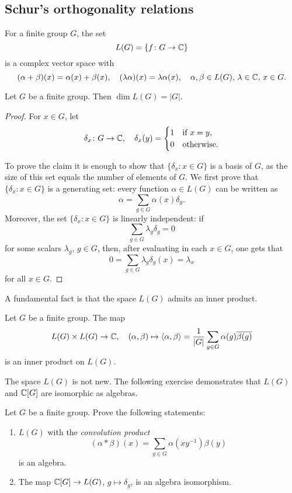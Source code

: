 \subsection{Schur's orthogonality relations}

For a finite group $G$, the set                             
\[
L(G)=\{f\colon G\to\mathbb{C}\}
\]
is a complex vector space with
\[
    (\alpha+\beta)(x)=\alpha(x)+\beta(x),
    \quad
    (\lambda\alpha)(x)=\lambda\alpha(x),
    \quad 
    \alpha,\beta\in L(G),\,\lambda\in\mathbb{C},\,x\in G.
\]

\begin{proposition}
\label{pro:dimL(G)=|G|}
    Let $G$ be a finite group. Then $\dim L(G)=|G|$. 
\end{proposition}

\begin{proof}
For $x\in G$, 
let 
\[
\delta_x\colon G\to\mathbb{C},\quad \delta_x(y)=\begin{cases}
    1 & \text{if $x=y$},\\
    0 & \text{otherwise.}
    \end{cases}
\]

To prove the claim it is enough to show that 
$\{\delta_x:x\in G\}$ is a basis of $G$, as the size of this set equals the
number of elements of $G$. 
We first prove that $\{\delta_x:x\in G\}$  is a generating set: every function
$\alpha\in L(G)$ can be written as
\[
\alpha=\sum_{g\in G}\alpha(x)\delta_g.
\]
Moreover, the set $\{\delta_x:x\in G\}$ is linearly independent: if 
\[
\sum_{g\in G}\lambda_g\delta_g=0
\]
for some scalars $\lambda_g$, $g\in G$, then, after evaluating in each $x\in G$, one gets that 
\[
0%
=\sum_{g\in G}\lambda_g\delta_g(x)=\lambda_x
\]
for all $x\in G$. 
\end{proof}

A fundamental fact is that the space $L(G)$ admits an inner product. 

\begin{exercise}
Let $G$ be a finite group. The map 
\[
L(G)\times L(G)\to\mathbb{C},\quad 
(\alpha,\beta)\mapsto \langle\alpha,\beta\rangle=\frac{1}{|G|}\sum_{g\in G}\alpha(g)\overline{\beta(g)}
\]
is an inner product on $L(G)$. 
\end{exercise}

The space $L(G)$ is not new. The following exercise demonstrates that 
$L(G)$ and $\mathbb{C}[G]$ are isomorphic as algebras. 

\begin{bonus}
Let $G$ be a finite group. Prove the following statements:
\begin{enumerate}
    \item $L(G)$ with the \emph{convolution product}
    \[
    (\alpha*\beta)(x)=\sum_{y\in G}\alpha(xy^{-1})\beta(y)
    \]
    is an algebra. 
    \item The map $\mathbb{C}[G]\to L(G)$, $g\mapsto\delta_g$,
        is an algebra isomorphism.
    \end{enumerate}
\end{bonus}

